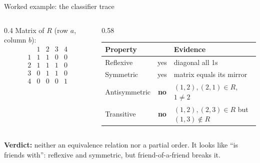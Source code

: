 \documentclass[aspectratio=169,10pt]{beamer}
\begin{document}
\begin{frame}{Worked example: the classifier trace}
\begin{columns}[T]
\begin{column}{0.4\textwidth}
Matrix of $R$ (row $a$, column $b$):
\[
\begin{array}{c|cccc}
 & 1&2&3&4\\\hline
1&1&1&0&0\\
2&1&1&1&0\\
3&0&1&1&0\\
4&0&0&0&1
\end{array}
\]
\end{column}
\begin{column}{0.58\textwidth}
\begin{tabular}{@{}lcp{4.2cm}@{}}
\textbf{Property} & & \textbf{Evidence} \\\hline
Reflexive & yes & diagonal all 1s \\
Symmetric & yes & matrix equals its mirror \\
Antisymmetric & \textbf{no} & $(1,2),(2,1)\in R$, $1\neq2$ \\
Transitive & \textbf{no} & $(1,2),(2,3)\in R$ but $(1,3)\notin R$ \\
\end{tabular}
\end{column}
\end{columns}
\vspace{6pt}
\textbf{Verdict:} neither an equivalence relation nor a partial order. It looks like ``is friends with'': reflexive and symmetric, but friend-of-a-friend breaks it.
\end{frame}
\end{document}
